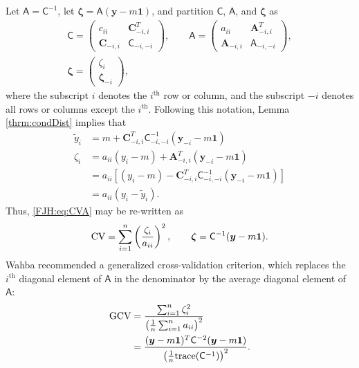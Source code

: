 \documentclass[twocolumn]{svjour3}          %
\newcommand{\bm}[1]{\boldsymbol{#1}}
\newcommand{\trace}[1]{\textup{trace}{#1}}
\newcommand{\vzeta}{{\bm{\zeta}}}
\newcommand{\vA}{\bm{A}}
\newcommand{\vC}{\bm{C}}
\newcommand{\vy}{\bm{y}}
\newcommand{\vone}{\bm{1}}
\newcommand{\mA}{\mathsf{A}}
\newcommand{\mC}{\mathsf{C}}
\begin{document}
Let $\mA = \mC^{-1}$, let $\vzeta = \mA (\vy - m \vone)$, and partition $\mC$, $\mA$, and $\vzeta$ as
\begin{gather*}
\mC = \begin{pmatrix} c_{ii}  & \vC_{-i,i}^T \\  \vC_{-i,i} & \mC_{-i,-i}\end{pmatrix}, \qquad
\mA = \begin{pmatrix} a_{ii}  & \vA_{-i,i}^T \\  \vA_{-i,i} & \mA_{-i,-i}\end{pmatrix}, \\ \vzeta = \begin{pmatrix} \zeta_i   \\  \vzeta_{-i} \end{pmatrix},
\end{gather*}
where the subscript $i$ denotes the $i^{\text{th}}$ row or column, and the subscript $-i$ denotes all rows or columns except the $i^{\text{th}}$. Following this notation, Lemma \ref{thrm:condDist} implies that 
\begin{align*}
\widetilde{y}_i & = m + \vC^T_{-i,i} \mC_{-i,-i}^{-1} (\vy_{-i} -m \vone)  \\
\zeta_i  & = a_{ii}(y_i - m) + \vA_{-i,i}^T(\vy_{-i} - m \vone) \\
& = a_{ii}[(y_i - m) - \vC^T_{-i,i} \mC_{-i,-i}^{-1} (\vy_{-i} -m \vone)] \\
& = a_{ii}(y_i - \widetilde{y}_i).
\end{align*}
Thus, \eqref{FJH:eq:CVA} may be re-written as 
\begin{equation*} %
\textup{CV} = \sum_{i=1}^n \left(\frac{\zeta_i}{a_{ii}} \right)^2, \qquad \vzeta = \mC^{-1}(\vy - m \vone).
\end{equation*}
Wahba \cite{WahbaGCV} recommended a generalized cross-validation criterion, which replaces the $i^{\text{th}}$ diagonal element of $\mA$ in the denominator by the average diagonal element of $\mA$:
\begin{align} 
\nonumber
\textup{GCV} &
= \frac{\sum_{i=1}^n\zeta_i^2}{\left(\frac 1n \sum_{i=1}^n a_{ii} \right)^2} \\
\label{FJH:eq:GCV}
& = \frac{(\vy - m\vone)^T \mC^{-2} (\vy - m \vone)}{\left(\frac 1n \trace(\mC^{-1}) \right)^2}.
\end{align}
\end{document}
